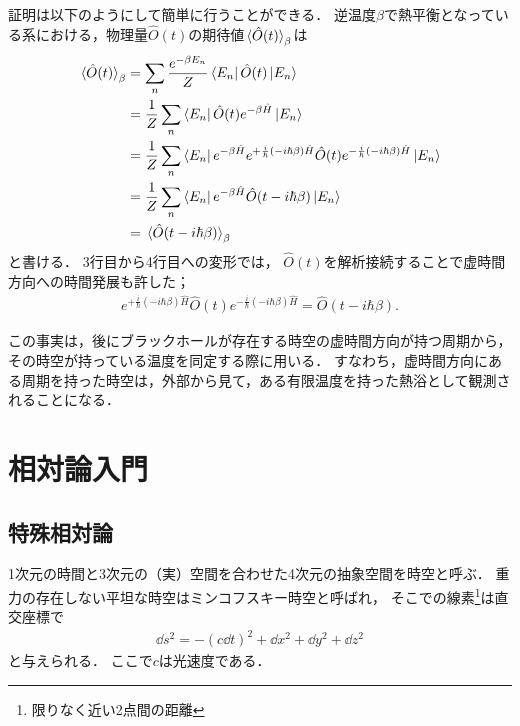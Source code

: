 \documentclass[uplatex,dvipdfmx]{vkaishi}
\begin{document}
証明は以下のようにして簡単に行うことができる．
逆温度$\beta$で熱平衡となっている系における，物理量$\hat O(t)$の期待値$\expval*{\hat O(t)}_\beta$は
\begin{align*}
  \expval*{\hat O(t)}_\beta
  &= \sum_n \frac{e^{-\beta E_n}}{Z} \bra{E_n} \hat O(t) \ket{E_n} \\
  &= \frac1Z \sum_n \bra{E_n} \hat O(t) e^{-\beta \hat H} \ket{E_n} \\
  &= \frac1Z \sum_n \bra{E_n} e^{-\beta \hat H} e^{+\frac{i}{\hbar}(-i\hbar\beta) \hat H} \hat O(t) e^{-\frac{i}{\hbar}(-i\hbar\beta) \hat H} \ket{E_n} \\
  &= \frac1Z \sum_n \bra{E_n} e^{-\beta \hat H} \hat O(t - i\hbar\beta) \ket{E_n} \\
    &= \expval*{\hat O(t - i\hbar\beta)}_\beta
\end{align*}
と書ける．
3行目から4行目への変形では，
$\hat O(t)$を解析接続することで虚時間方向への時間発展も許した；
\begin{align}
  e^{+\frac{i}{\hbar}(-i\hbar\beta) \hat H} \hat O(t) e^{-\frac{i}{\hbar}(-i\hbar\beta) \hat H}
  = \hat O(t - i\hbar\beta).
\end{align}
\QED

この事実は，後にブラックホールが存在する時空の虚時間方向が持つ周期から，その時空が持っている温度を同定する際に用いる．
すなわち，虚時間方向にある周期を持った時空は，外部から見て，ある有限温度を持った熱浴として観測されることになる．


\section{相対論入門}

\subsection{特殊相対論}

1次元の時間と3次元の（実）空間を合わせた4次元の抽象空間を時空と呼ぶ．
重力の存在しない平坦な時空はミンコフスキー時空と呼ばれ，
そこでの線素\footnote{限りなく近い2点間の距離}は直交座標で
\begin{align}
  \dd{s}^2
  = - (c\dd{t})^2 + \dd{x}^2 + \dd{y}^2 + \dd{z}^2
  \label{eq:ds-m-x}
\end{align}
と与えられる．
ここで$c$は光速度である．
\end{document}
